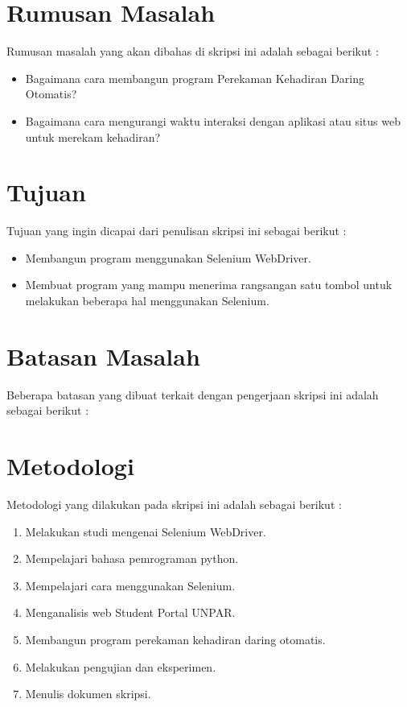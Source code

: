 \section{Rumusan Masalah}
\label{sec:rumusan}
Rumusan masalah yang akan dibahas di skripsi ini adalah sebagai berikut :
\begin{itemize}
	\item Bagaimana cara membangun program Perekaman Kehadiran Daring Otomatis?
	\item Bagaimana cara mengurangi waktu interaksi dengan aplikasi atau situs web untuk merekam kehadiran?
\end{itemize}

\section{Tujuan}
\label{sec:tujuan}
Tujuan yang ingin dicapai dari penulisan skripsi ini sebagai berikut :
\begin{itemize}
	\item Membangun program menggunakan Selenium WebDriver.
	\item Membuat program yang mampu menerima rangsangan satu tombol untuk melakukan beberapa hal menggunakan Selenium.
\end{itemize}

\section{Batasan Masalah}
\label{sec:batasan}
Beberapa batasan yang dibuat terkait dengan pengerjaan skripsi ini adalah sebagai berikut :
\begin{enumerate}
	
\end{enumerate}


\section{Metodologi}
\label{sec:metlit}
Metodologi yang dilakukan pada skripsi ini adalah sebagai berikut :
\begin{enumerate}
	\item Melakukan studi mengenai Selenium WebDriver.
	\item Mempelajari bahasa pemrograman python.
	\item Mempelajari cara menggunakan Selenium.
	\item Menganalisis web Student Portal UNPAR.
	\item Membangun program perekaman kehadiran daring otomatis.
	\item Melakukan pengujian dan eksperimen.
	\item Menulis dokumen skripsi.		
\end{enumerate}



